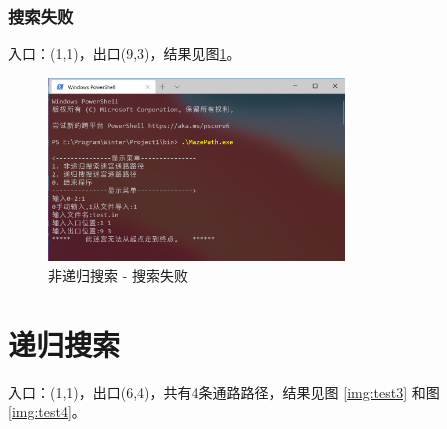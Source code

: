 \documentclass{ctexart}
\begin{document}
    \subsubsection{搜索失败}

    入口：(1,1)，出口(9,3)，结果见图\ref{img:test2}。

    \begin{figure}[h]
        \centering
        \includegraphics[width=0.7\textwidth]{测试结果6.png}
        \caption{非递归搜索 - 搜索失败}
        \label{img:test2}
    \end{figure}


    \section{递归搜索}

    入口：(1,1)，出口(6,4)，共有4条通路路径，结果见图 \ref{img:test3} 和图 \ref{img:test4}。
\end{document}
